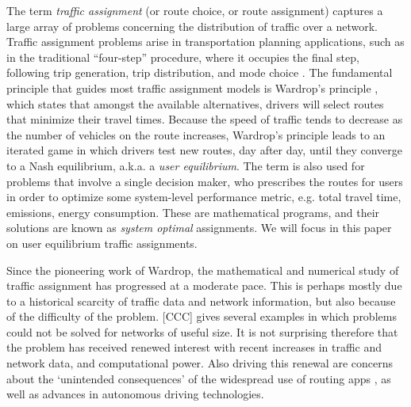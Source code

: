 The term \textit{traffic assignment} (or route choice, or route assignment) captures a large array of problems concerning the distribution of traffic over a network. Traffic assignment problems arise in transportation planning applications, such as in the traditional ``four-step'' procedure, where it occupies the final step, following trip generation, trip distribution, and mode choice \cite{mcnally2007four}.  The fundamental principle that guides most traffic assignment models is Wardrop's principle \cite{wardrop1952some}, which states that amongst the available alternatives, drivers will select routes that minimize their travel times. Because the speed of traffic tends to decrease as the number of vehicles on the route increases, Wardrop's principle leads to an iterated game in which drivers test new routes, day after day, until they converge to a Nash equilibrium, a.k.a. a \textit{user equilibrium}. The term is also used for problems that involve a single decision maker, who prescribes the routes for users in order to optimize some system-level performance metric, e.g. total travel time, emissions, energy consumption. These are mathematical programs, and their solutions are known as \textit{system optimal} assignments. We will focus in this paper on user equilibrium traffic assignments. 

Since the pioneering work of Wardrop, the mathematical and numerical study of traffic assignment has progressed at a moderate pace.  
This is perhaps mostly due to a historical scarcity of traffic data and network information, but also because of the difficulty of the problem. [CCC] gives several examples in which problems could not be solved for networks of useful size. It is not surprising therefore that the problem has received renewed interest with recent increases in traffic and network data, and computational power. Also driving this renewal are concerns about the `unintended consequences' of the widespread use of routing apps \cite{traffic_apps}, as well as advances in autonomous driving technologies.

